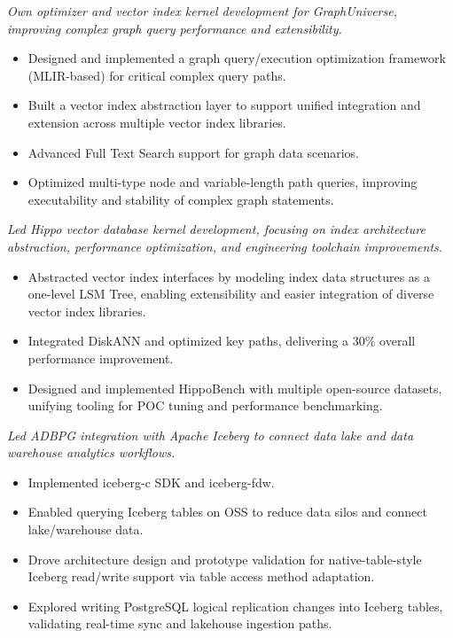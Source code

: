 \documentclass{resume}
\begin{document}
\textit{Own optimizer and vector index kernel development for GraphUniverse, improving complex graph query performance and extensibility.}
\begin{onehalfspacing}
\begin{itemize}
  \item Designed and implemented a graph query/execution optimization framework (MLIR-based) for critical complex query paths.
  \item Built a vector index abstraction layer to support unified integration and extension across multiple vector index libraries.
  \item Advanced Full Text Search support for graph data scenarios.
  \item Optimized multi-type node and variable-length path queries, improving executability and stability of complex graph statements.
\end{itemize}
\end{onehalfspacing}

\textit{Led Hippo vector database kernel development, focusing on index architecture abstraction, performance optimization, and engineering toolchain improvements.}
\begin{onehalfspacing}
\begin{itemize}
  \item Abstracted vector index interfaces by modeling index data structures as a one-level LSM Tree, enabling extensibility and easier integration of diverse vector index libraries.
  \item Integrated DiskANN and optimized key paths, delivering a 30\% overall performance improvement.
  \item Designed and implemented HippoBench with multiple open-source datasets, unifying tooling for POC tuning and performance benchmarking.
\end{itemize}
\end{onehalfspacing}

\textit{Led ADBPG integration with Apache Iceberg to connect data lake and data warehouse analytics workflows.}
\begin{onehalfspacing}
\begin{itemize}
  \item Implemented iceberg-c SDK and iceberg-fdw.
  \item Enabled querying Iceberg tables on OSS to reduce data silos and connect lake/warehouse data.
  \item Drove architecture design and prototype validation for native-table-style Iceberg read/write support via table access method adaptation.
  \item Explored writing PostgreSQL logical replication changes into Iceberg tables, validating real-time sync and lakehouse ingestion paths.
\end{itemize}
\end{onehalfspacing}
\end{document}
